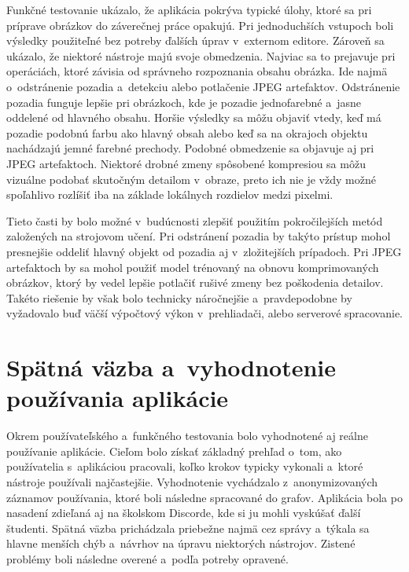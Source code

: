 Funkčné testovanie ukázalo, že aplikácia pokrýva typické úlohy, ktoré sa pri príprave obrázkov do záverečnej práce opakujú. Pri jednoduchších vstupoch boli výsledky použiteľné bez potreby ďalších úprav v~externom editore. Zároveň sa ukázalo, že niektoré nástroje majú svoje obmedzenia. Najviac sa to prejavuje pri operáciách, ktoré závisia od správneho rozpoznania obsahu obrázka. Ide najmä o~odstránenie pozadia a~detekciu alebo potlačenie JPEG artefaktov. Odstránenie pozadia funguje lepšie pri obrázkoch, kde je pozadie jednofarebné a~jasne oddelené od hlavného obsahu. Horšie výsledky sa môžu objaviť vtedy, keď má pozadie podobnú farbu ako hlavný obsah alebo keď sa na okrajoch objektu nachádzajú jemné farebné prechody. Podobné obmedzenie sa objavuje aj pri JPEG artefaktoch. Niektoré drobné zmeny spôsobené kompresiou sa môžu vizuálne podobať skutočným detailom v~obraze, preto ich nie je vždy možné spoľahlivo rozlíšiť iba na základe lokálnych rozdielov medzi pixelmi.

Tieto časti by bolo možné v~budúcnosti zlepšiť použitím pokročilejších metód založených na strojovom učení. Pri odstránení pozadia by takýto prístup mohol presnejšie oddeliť hlavný objekt od pozadia aj v~zložitejších prípadoch. Pri JPEG artefaktoch by sa mohol použiť model trénovaný na obnovu komprimovaných obrázkov, ktorý by vedel lepšie potlačiť rušivé zmeny bez poškodenia detailov. Takéto riešenie by však bolo technicky náročnejšie a~pravdepodobne by vyžadovalo buď väčší výpočtový výkon v~prehliadači, alebo serverové spracovanie.

\section{Spätná väzba a~vyhodnotenie používania aplikácie}
\label{sec:analytics_feedback}

Okrem používateľského a~funkčného testovania bolo vyhodnotené aj reálne používanie aplikácie. Cieľom bolo získať základný prehľad o~tom, ako používatelia s~aplikáciou pracovali, koľko krokov typicky vykonali a~ktoré nástroje používali najčastejšie. Vyhodnotenie vychádzalo z~anonymizovaných záznamov používania, ktoré boli následne spracované do grafov. Aplikácia bola po nasadení zdieľaná aj na školskom Discorde, kde si ju mohli vyskúšať ďalší študenti. Spätná väzba prichádzala priebežne najmä cez správy a~týkala sa hlavne menších chýb a~návrhov na úpravu niektorých nástrojov. Zistené problémy boli následne overené a~podľa potreby opravené.


